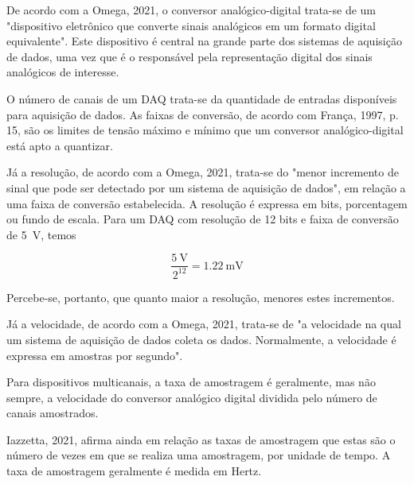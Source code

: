 \documentclass[
	12pt,				
	oneside,			
	a4paper,			
	english,			
	brazil,			
	]{abntex2ppgsi}
\begin{document}
De acordo com a Omega, 2021, o conversor analógico-digital trata-se de um "dispositivo eletrônico que converte sinais analógicos em um formato digital equivalente". Este dispositivo é central na grande parte dos sistemas de aquisição de dados, uma vez que é o responsável pela representação digital dos sinais analógicos de interesse. 


O número de canais de um DAQ trata-se da quantidade de entradas disponíveis para aquisição de dados. As faixas de conversão, de acordo com França, 1997, p. 15, são os limites de tensão máximo e mínimo que um conversor analógico-digital está apto a quantizar.

Já a resolução, de acordo com a Omega, 2021, trata-se do "menor incremento de sinal que pode ser detectado por um sistema de aquisição de dados", em relação a uma faixa de conversão estabelecida. A resolução é expressa em bits, porcentagem ou fundo de escala. Para um DAQ com resolução de 12 bits e faixa de conversão de \SI{5}{\volt}, temos 

\begin{equation}
	\frac{\SI{5}{\volt}}{2^{12}} = \SI{1,22}{\milli\volt}
	\label{eq: Resolução de DAQ de 12 bits com faixa de conversão de 5 volts}
\end{equation}


Percebe-se, portanto, que quanto maior a resolução, menores estes incrementos. 

Já a velocidade, de acordo com a Omega, 2021, trata-se de "a velocidade na qual um sistema de aquisição de dados coleta os dados. Normalmente, a velocidade é expressa em amostras por segundo". 

Para dispositivos multicanais, a taxa de amostragem é geralmente, mas não sempre, a velocidade do conversor analógico digital dividida pelo número de canais amostrados. 

Iazzetta, 2021, afirma ainda em relação as taxas de amostragem que estas são o número de vezes em que se realiza uma amostragem, por unidade de tempo. A taxa de amostragem geralmente é medida em Hertz. 

\end{document}
